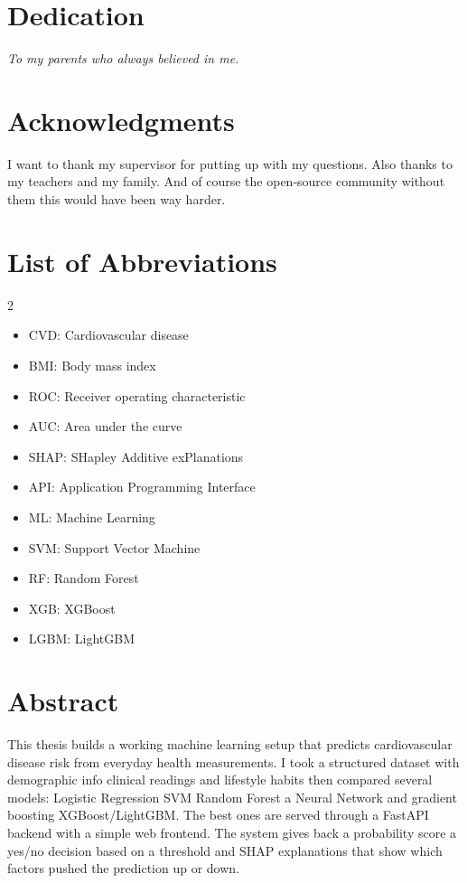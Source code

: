 \documentclass[11pt, a4paper, oneside]{book}
\begin{document}
\chapter*{Dedication}
\begin{center}
\emph{To my parents who always believed in me.}
\end{center}

\chapter*{Acknowledgments}
I want to thank my supervisor for putting up with my questions. Also thanks to my teachers and my family. And of course the open‑source community without them this would have been way harder.

\tableofcontents
\listoffigures
\listoftables

\chapter*{List of Abbreviations}
\begin{multicols}{2}
\begin{itemize}
\item CVD: Cardiovascular disease
\item BMI: Body mass index
\item ROC: Receiver operating characteristic
\item AUC: Area under the curve
\item SHAP: SHapley Additive exPlanations
\item API: Application Programming Interface
\item ML: Machine Learning
\item SVM: Support Vector Machine
\item RF: Random Forest
\item XGB: XGBoost
\item LGBM: LightGBM
\end{itemize}
\end{multicols}

\chapter*{Abstract}
This thesis builds a working machine learning setup that predicts cardiovascular disease risk from everyday health measurements. I took a structured dataset with demographic info clinical readings and lifestyle habits then compared several models: Logistic Regression SVM Random Forest a Neural Network and gradient boosting XGBoost/LightGBM. The best ones are served through a FastAPI backend with a simple web frontend. The system gives back a probability score a yes/no decision based on a threshold and SHAP explanations that show which factors pushed the prediction up or down.
\end{document}

